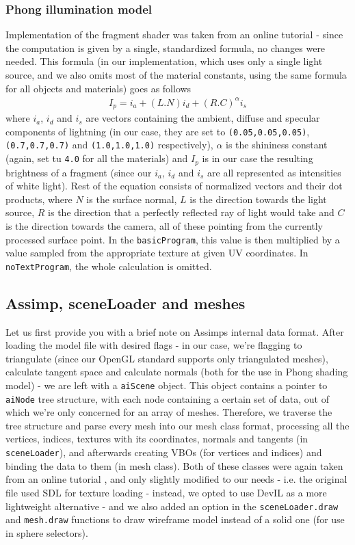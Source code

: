 \subsubsection{Phong illumination model}

Implementation of the fragment shader was taken from an online tutorial \cite{OGLAssimp} - since the computation is given by a single, standardized formula, no changes were needed. This formula (in our implementation, which uses only a single light source, and we also omits most of the material constants, using the same formula for all objects and materials) goes as follows
\begin{align*}
I_p = i_a+(L.N)i_d+(R.C)^{\alpha}i_s
\end{align*} 
where $i_a$, $i_d$ and $i_s$ are vectors containing the ambient, diffuse and specular components of lightning (in our case, they are set to \texttt{(0.05,0.05,0.05)}, \texttt{(0.7,0.7,0.7)} and \texttt{(1.0,1.0,1.0)} respectively), $\alpha$ is the shininess constant (again, set tu \texttt{4.0} for all the materials) and $I_p$ is in our case the resulting brightness of a fragment (since our $i_a$, $i_d$ and $i_s$ are all represented as intensities of white light). Rest of the equation consists of normalized vectors and their dot products, where $N$ is the surface normal, $L$ is the direction towards the light source, $R$ is the direction that a perfectly reflected ray of light would take and $C$ is the direction towards the camera, all of these pointing from the currently processed surface point. In the \texttt{basicProgram}, this value is then multiplied by a value sampled from the appropriate texture at given UV coordinates. In \texttt{noTextProgram}, the whole calculation is omitted.

\subsection{Assimp, sceneLoader and meshes}

Let us first provide you with a brief note on Assimps internal data format. After loading the model file with desired flags - in our case, we're flagging to triangulate (since our OpenGL standard supports only triangulated meshes), calculate tangent space and calculate normals (both for the use in Phong shading model) - we are left with a \texttt{aiScene} object. This object contains a pointer to \texttt{aiNode} tree structure, with each node containing a certain set of data, out of which we're only concerned for an array of meshes. Therefore, we traverse the tree structure and parse every mesh into our mesh class format, processing all the vertices, indices, textures with its coordinates, normals and tangents (in \texttt{sceneLoader}), and afterwards creating VBOs (for vertices and indices) and binding the data to them (in mesh class). Both of these classes were again taken from an online tutorial \cite{OGLAssimp}, and only slightly modified to our needs - i.e. the original file used SDL for texture loading - instead, we opted to use DevIL as a more lightweight alternative - and we also added an option in the \texttt{sceneLoader.draw} and \texttt{mesh.draw} functions to draw wireframe model instead of a solid one (for use in sphere selectors).

